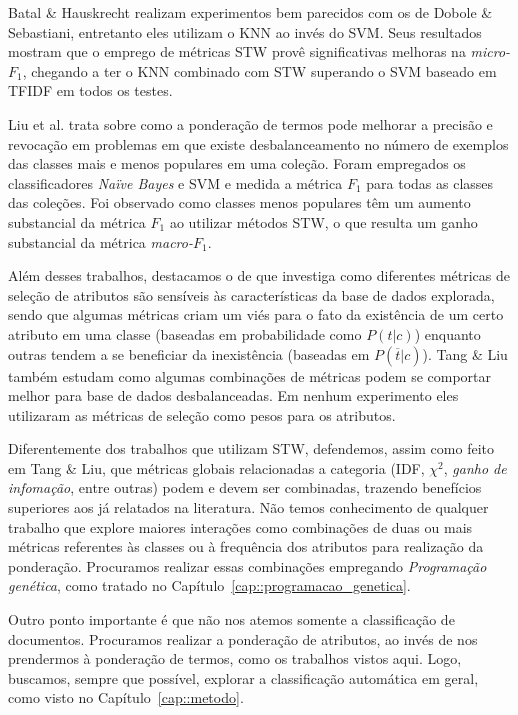Batal \& Hauskrecht realizam experimentos bem parecidos com os de Dobole \& Sebastiani, entretanto eles utilizam o \textsc{KNN} ao invés do \textsc{SVM}. Seus resultados mostram que o emprego de métricas \textsc{STW} provê significativas melhoras na \textit{micro-$F_1$}, chegando a ter o \textsc{KNN} combinado com \textsc{STW} superando o \textsc{SVM} baseado em \textsc{TFIDF} em todos os testes.

Liu et al. trata sobre como a ponderação de termos pode melhorar a precisão e revocação em problemas em que existe desbalanceamento no número de exemplos das classes mais e menos populares em uma coleção. Foram empregados os classificadores \textit{Naïve Bayes} e \textsc{SVM} e medida a métrica $F_1$ para todas as classes das coleções. Foi observado como classes menos populares têm um aumento substancial da métrica $F_1$ ao utilizar métodos \textsc{STW}, o que resulta um ganho substancial da métrica \textit{macro-$F_1$}.

Além desses trabalhos, destacamos o de \cite{Tang05} que investiga como diferentes métricas de seleção de atributos são sensíveis às características da base de dados explorada, sendo que algumas métricas criam um viés para o fato da existência de um certo atributo em uma classe (baseadas em probabilidade como $P(t|c)$) enquanto outras tendem a se beneficiar da inexistência (baseadas em $P(\overline{t}|c)$). Tang \& Liu também estudam como algumas combinações de métricas podem se comportar melhor para base de dados desbalanceadas. Em nenhum experimento eles utilizaram as métricas de seleção como pesos para os atributos.

Diferentemente dos trabalhos que utilizam \textsc{STW}, defendemos, assim como feito em Tang \& Liu, que métricas globais relacionadas a categoria (\textsc{IDF}, $\chi^2$, \textit{ganho de infomação}, entre outras) podem e devem ser combinadas, trazendo benefícios superiores aos já relatados na literatura. Não temos conhecimento de qualquer trabalho que explore maiores interações como combinações de duas ou mais métricas referentes às classes ou à frequência dos atributos para realização da ponderação. Procuramos realizar essas combinações empregando \textit{Programação genética}, como tratado no Capítulo~\ref{cap::programacao_genetica}.

Outro ponto importante é que não nos atemos somente a classificação de documentos. Procuramos realizar a ponderação de atributos, ao invés de nos prendermos à ponderação de termos, como os trabalhos vistos aqui. Logo, buscamos, sempre que possível, explorar a classificação automática em geral, como visto no Capítulo~\ref{cap::metodo}.

